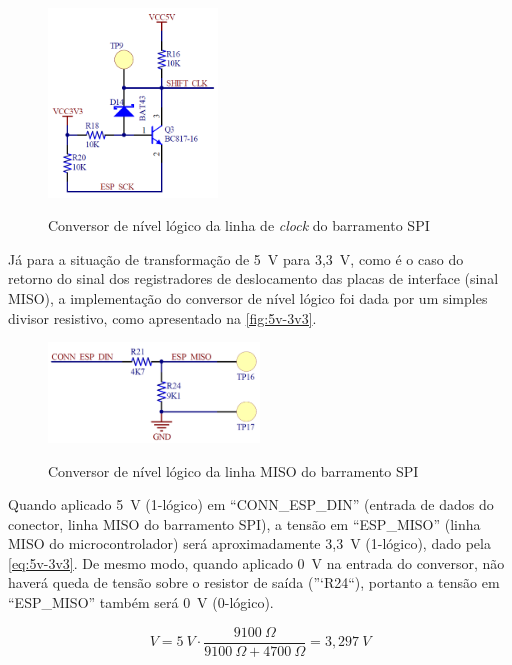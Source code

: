\begin{figure}[H]
    \centering
    \caption{Conversor de nível lógico da linha de \emph{clock} do barramento SPI}
    \includegraphics[width=0.4\textwidth]{./dados/figuras/3v3-5v}
    \label{fig:3v3-5v}
\end{figure}

Já para a situação de transformação de {5\ V} para {3,3\ V}, como é o caso do retorno do sinal dos registradores de deslocamento das placas de interface (sinal MISO), a implementação do conversor de nível lógico foi dada por um simples divisor resistivo, como apresentado na \autoref{fig:5v-3v3}.

\begin{figure}[H]
    \centering
    \caption{Conversor de nível lógico da linha MISO do barramento SPI}
    \includegraphics[width=0.5\textwidth]{./dados/figuras/5v-3v3}
    \label{fig:5v-3v3}
\end{figure}

Quando aplicado {5\ V} (1-lógico) em ``CONN\_ESP\_DIN'' (entrada de dados do conector, linha MISO do barramento SPI), a tensão em ``ESP\_MISO'' (linha MISO do microcontrolador) será aproximadamente {3,3\ V} (1-lógico), dado pela \autoref{eq:5v-3v3}. De mesmo modo, quando aplicado {0\ V} na entrada do conversor, não haverá queda de tensão sobre o resistor de saída (''`R24``), portanto a tensão em ``ESP\_MISO'' também será {0\ V} (0-lógico).

\begin{equation}
    V = {5\ V} \cdot \frac{9100\ \Omega}{9100\ \Omega+4700\ \Omega} = 3,297\ V
    \label{eq:5v-3v3}
\end{equation}

